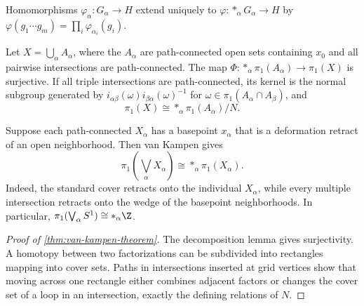 \begin{proposition}
\label{prop:free-product-universal-property}



Homomorphisms $\varphi_\alpha:G_\alpha\to H$ extend uniquely to
$\varphi:*_\alpha G_\alpha\to H$ by
$\varphi(g_1\cdots g_m)=\prod_i\varphi_{\alpha_i}(g_i)$.
\end{proposition}

\begin{theorem}
\label{thm:van-kampen-theorem}

Let $X=\bigcup_\alpha A_\alpha$, where the $A_\alpha$ are path-connected open
sets containing $x_0$ and all pairwise intersections are path-connected. The
map $\Phi:*_\alpha\pi_1(A_\alpha)\to\pi_1(X)$ is surjective. If all triple
intersections are path-connected, its kernel is the normal subgroup generated
by $i_{\alpha\beta}(\omega)i_{\beta\alpha}(\omega)^{-1}$ for
$\omega\in\pi_1(A_\alpha\cap A_\beta)$, and
\[
\pi_1(X)\cong *_\alpha\pi_1(A_\alpha)/N.
\]
\end{theorem}

\begin{example}
\label{ex:wedge-sum-fundamental-group}

Suppose each path-connected $X_\alpha$ has a basepoint $x_\alpha$ that is a
deformation retract of an open neighborhood. Then van Kampen gives
\[
\pi_1\left(\bigvee_\alpha X_\alpha\right)\cong *_\alpha\pi_1(X_\alpha).
\]
Indeed, the standard cover retracts onto the individual $X_\alpha$, while every
multiple intersection retracts onto the wedge of the basepoint neighborhoods.
In particular, $\pi_1(\bigvee_\alpha S^1)\cong *_\alpha\Z$.
\end{example}

\begin{proof}[Proof of \cref{thm:van-kampen-theorem}]
\sketch The decomposition lemma gives surjectivity. A homotopy between two
factorizations can be subdivided into rectangles mapping into cover sets.
Paths in intersections inserted at grid vertices show that moving across one
rectangle either combines adjacent factors or changes the cover set of a loop
in an intersection, exactly the defining relations of $N$.
\end{proof}

